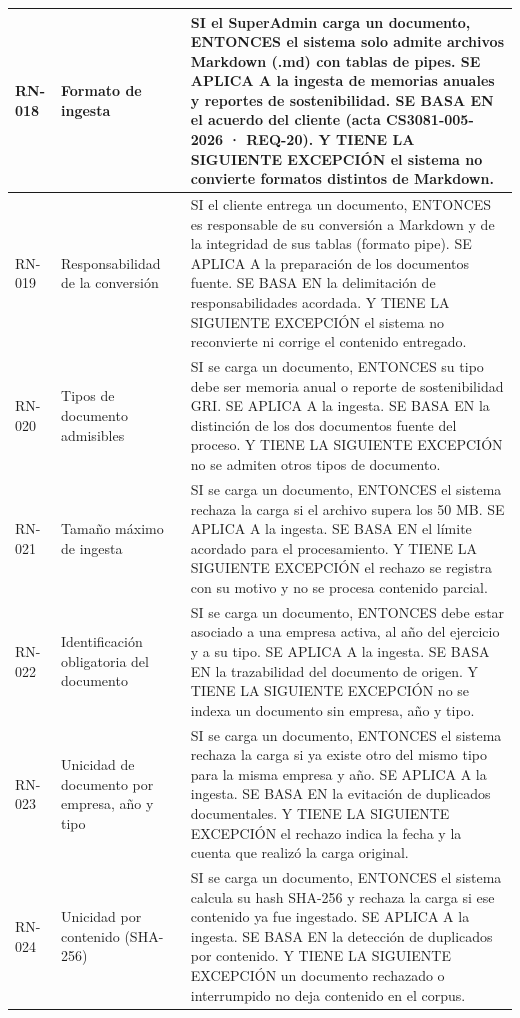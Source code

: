 \begin{longtable}{|C{1.4cm}|L{4.0cm}|L{9.4cm}|}
\hline
RN-018 & Formato de ingesta & SI el SuperAdmin carga un documento, ENTONCES el sistema solo admite archivos Markdown (.md) con tablas de pipes. SE APLICA A la ingesta de memorias anuales y reportes de sostenibilidad. SE BASA EN el acuerdo del cliente (acta CS3081-005-2026 · REQ-20). Y TIENE LA SIGUIENTE EXCEPCIÓN el sistema no convierte formatos distintos de Markdown. \\
\hline
RN-019 & Responsabilidad de la conversión & SI el cliente entrega un documento, ENTONCES es responsable de su conversión a Markdown y de la integridad de sus tablas (formato pipe). SE APLICA A la preparación de los documentos fuente. SE BASA EN la delimitación de responsabilidades acordada. Y TIENE LA SIGUIENTE EXCEPCIÓN el sistema no reconvierte ni corrige el contenido entregado. \\
\hline
RN-020 & Tipos de documento admisibles & SI se carga un documento, ENTONCES su tipo debe ser memoria anual o reporte de sostenibilidad GRI. SE APLICA A la ingesta. SE BASA EN la distinción de los dos documentos fuente del proceso. Y TIENE LA SIGUIENTE EXCEPCIÓN no se admiten otros tipos de documento. \\
\hline
RN-021 & Tamaño máximo de ingesta & SI se carga un documento, ENTONCES el sistema rechaza la carga si el archivo supera los 50 MB. SE APLICA A la ingesta. SE BASA EN el límite acordado para el procesamiento. Y TIENE LA SIGUIENTE EXCEPCIÓN el rechazo se registra con su motivo y no se procesa contenido parcial. \\
\hline
RN-022 & Identificación obligatoria del documento & SI se carga un documento, ENTONCES debe estar asociado a una empresa activa, al año del ejercicio y a su tipo. SE APLICA A la ingesta. SE BASA EN la trazabilidad del documento de origen. Y TIENE LA SIGUIENTE EXCEPCIÓN no se indexa un documento sin empresa, año y tipo. \\
\hline
RN-023 & Unicidad de documento por empresa, año y tipo & SI se carga un documento, ENTONCES el sistema rechaza la carga si ya existe otro del mismo tipo para la misma empresa y año. SE APLICA A la ingesta. SE BASA EN la evitación de duplicados documentales. Y TIENE LA SIGUIENTE EXCEPCIÓN el rechazo indica la fecha y la cuenta que realizó la carga original. \\
\hline
RN-024 & Unicidad por contenido (SHA-256) & SI se carga un documento, ENTONCES el sistema calcula su hash SHA-256 y rechaza la carga si ese contenido ya fue ingestado. SE APLICA A la ingesta. SE BASA EN la detección de duplicados por contenido. Y TIENE LA SIGUIENTE EXCEPCIÓN un documento rechazado o interrumpido no deja contenido en el corpus. \\

\end{longtable}

